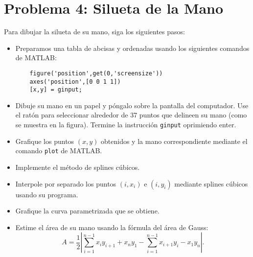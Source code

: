 
\section{Problema 4: Silueta de la Mano}
Para dibujar la silueta de su mano, siga los siguientes pasos:

\begin{itemize}
    \item Preparamos una tabla de abcisas y ordenadas usando los siguientes comandos de MATLAB:
    \begin{verbatim}
    figure('position',get(0,'screensize'))
    axes('position',[0 0 1 1])
    [x,y] = ginput;
    \end{verbatim}
    \item Dibuje su mano en un papel y póngalo sobre la pantalla del computador. Use el ratón para seleccionar alrededor de 37 puntos que delineen su mano (como se muestra en la figura). Termine la instrucción \texttt{ginput} oprimiendo enter.
    \item Grafique los puntos $(x, y)$ obtenidos y la mano correspondiente mediante el comando \texttt{plot} de MATLAB.
    \item Implemente el método de splines cúbicos.
    \item Interpole por separado los puntos $(i, x_i)$ e $(i, y_i)$ mediante splines cúbicos usando su programa.
    \item Grafique la curva parametrizada que se obtiene.
    \item Estime el área de su mano usando la fórmula del área de Gauss:
    \[
    A = \frac{1}{2} \left| \sum_{i=1}^{n-1} x_i y_{i+1} + x_n y_1 - \sum_{i=1}^{n-1} x_{i+1} y_i - x_1 y_n \right|.
    \]
\end{itemize}

